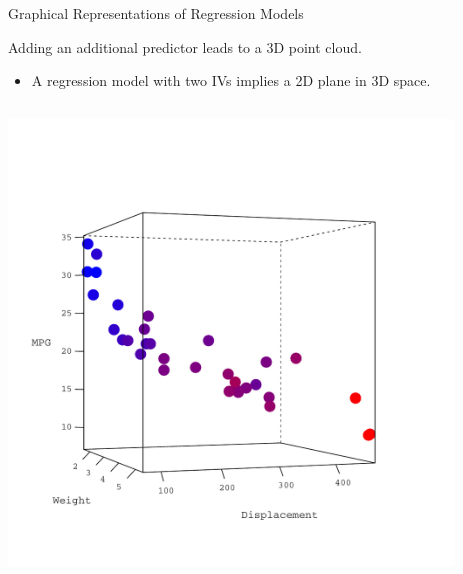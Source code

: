 \documentclass[10pt]{beamer}\usepackage[]{graphicx}\usepackage[]{color}
\begin{document}
\begin{frame}{Graphical Representations of Regression Models}

  Adding an additional predictor leads to a 3D point cloud.
  \vb
  \begin{itemize}
  \item A regression model with two IVs implies a 2D plane in 3D space.
  \end{itemize}

  \begin{columns}
    \begin{column}{0.45\textwidth}

      \includegraphics[width = 1.2\textwidth]{figures/3d_data_plot}

    \end{column}

    \begin{column}{0.1\textwidth}

      \begin{center}\huge{$~~~~\rightarrow$}\end{center}

    \end{column}

    \begin{column}{0.45\textwidth}


\end{column}
\end{columns}
\end{frame}
\end{document}
